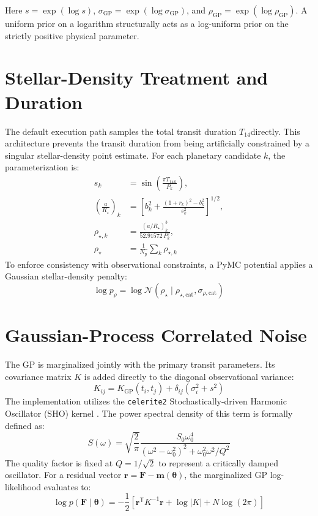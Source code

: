 \documentclass[12pt,a4paper,oneside]{report}
\newcommand{\Rstar}{\ensuremath{R_{\star}}}
\newcommand{\rhoStar}{\ensuremath{\rho_{\star}}}
\newcommand{\Porb}{\ensuremath{P}}
\newcommand{\Tfourteen}{\ensuremath{T_{14}}}
\newcommand{\code}[1]{\texttt{\small #1}}
\begin{document}
Here \(s=\exp(\log s)\), \(\sigma_{\mathrm{GP}}=\exp(\log\sigma_{\mathrm{GP}})\), and \(\rho_{\mathrm{GP}}=\exp(\log\rho_{\mathrm{GP}})\). A uniform prior on a logarithm structurally acts as a log-uniform prior on the strictly positive physical parameter.

\section{Stellar-Density Treatment and Duration}
The default execution path samples the total transit duration \Tfourteen directly. This architecture prevents the transit duration from being artificially constrained by a singular stellar-density point estimate. For each planetary candidate \(k\), the parameterization is:
\begin{align}
  s_k &= \sin\left(\frac{\pi\Tfourteen{}_{k}}{\Porb{}_{k}}\right),\\
  \left(\frac{a}{\Rstar}\right)_k &= \left[b_k^2 + \frac{(1+r_k)^2-b_k^2}{s_k^2}\right]^{1/2},\\
  \rho_{\star,k} &= \frac{(a/\Rstar)_k^3}{52.91572\,\Porb{}_{k}^2},\\
  \rhoStar &= \frac{1}{N_{\mathrm{p}}}\sum_k\rho_{\star,k}
\end{align}
To enforce consistency with observational constraints, a PyMC potential applies a Gaussian stellar-density penalty:
\begin{equation}
  \log p_{\rho} = \log\mathcal{N}(\rhoStar \mid \rho_{\star,\mathrm{cat}}, \sigma_{\rho,\mathrm{cat}})
\end{equation}

\section{Gaussian-Process Correlated Noise}
The GP is marginalized jointly with the primary transit parameters. Its covariance matrix \(K\) is added directly to the diagonal observational variance:
\begin{equation}
  K_{ij} = K_{\mathrm{GP}}(t_i,t_j) + \delta_{ij}\left(\sigma_i^2+s^2\right)
\end{equation}
The implementation utilizes the \code{celerite2} Stochastically-driven Harmonic Oscillator (SHO) kernel \cite{celerite2_2020}. The power spectral density of this term is formally defined as:
\begin{equation}
  S(\omega) = \sqrt{\frac{2}{\pi}} \frac{S_0 \omega_0^4}{(\omega^2 - \omega_0^2)^2 + \omega_0^2 \omega^2 / Q^2}
\end{equation}
The quality factor is fixed at \(Q=1/\sqrt{2}\) to represent a critically damped oscillator. For a residual vector \(\boldsymbol{r}=\boldsymbol{F}-\boldsymbol{m}(\boldsymbol{\theta})\), the marginalized GP log-likelihood evaluates to:
\begin{equation}
  \log p(\boldsymbol{F}\mid\boldsymbol{\theta}) = -\frac{1}{2}\left[\boldsymbol{r}^{\mathsf T}K^{-1}\boldsymbol{r} + \log|K| + N\log(2\pi)\right]
\end{equation}
\end{document}
